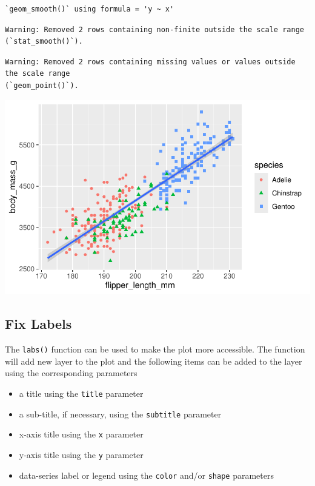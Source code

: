 \documentclass[
  letterpaper,
  DIV=11,
  numbers=noendperiod]{scrreprt}
\providecommand{\tightlist}{%
  \setlength{\itemsep}{0pt}\setlength{\parskip}{0pt}}\usepackage{longtable,booktabs,array}
\begin{document}
\begin{verbatim}
`geom_smooth()` using formula = 'y ~ x'
\end{verbatim}

\begin{verbatim}
Warning: Removed 2 rows containing non-finite outside the scale range
(`stat_smooth()`).
\end{verbatim}

\begin{verbatim}
Warning: Removed 2 rows containing missing values or values outside the scale range
(`geom_point()`).
\end{verbatim}

\includegraphics{src/r-for-data-science/01-data-viz_files/figure-pdf/unnamed-chunk-13-1.pdf}

\subsection{Fix Labels}\label{fix-labels}

The \texttt{labs()} function can be used to make the plot more
accessible. The function will add new layer to the plot and the
following items can be added to the layer using the corresponding
parameters

\begin{itemize}
\tightlist
\item
  a title using the \texttt{title} parameter
\item
  a sub-title, if necessary, using the \texttt{subtitle} parameter
\item
  x-axis title using the \texttt{x} parameter
\item
  y-axis title using the \texttt{y} parameter
\item
  data-series label or legend using the \texttt{color} and/or
  \texttt{shape} parameters
\end{itemize}
\end{document}
